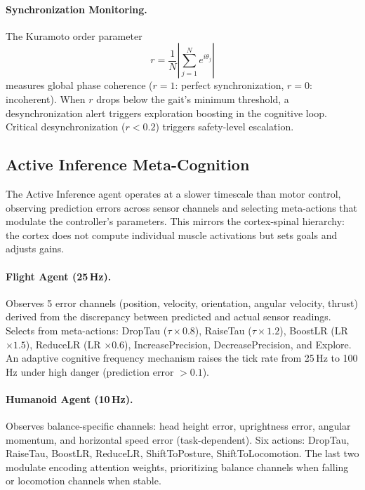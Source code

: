 \documentclass[11pt,twocolumn]{article}
\begin{document}
\paragraph{Synchronization Monitoring.} The Kuramoto order parameter
\begin{equation}
r = \frac{1}{N} \left| \sum_{j=1}^{N} e^{i\theta_j} \right|
\end{equation}
measures global phase coherence ($r = 1$: perfect synchronization, $r = 0$: incoherent). When $r$ drops below the gait's minimum threshold, a desynchronization alert triggers exploration boosting in the cognitive loop. Critical desynchronization ($r < 0.2$) triggers safety-level escalation.

\subsection{Active Inference Meta-Cognition}
\label{sec:fep}

The Active Inference agent operates at a slower timescale than motor control, observing prediction errors across sensor channels and selecting meta-actions that modulate the controller's parameters. This mirrors the cortex-spinal hierarchy: the cortex does not compute individual muscle activations but sets goals and adjusts gains.

\paragraph{Flight Agent (25\,Hz).} Observes 5 error channels (position, velocity, orientation, angular velocity, thrust) derived from the discrepancy between predicted and actual sensor readings. Selects from meta-actions: DropTau ($\tau \times 0.8$), RaiseTau ($\tau \times 1.2$), BoostLR (LR $\times 1.5$), ReduceLR (LR $\times 0.6$), IncreasePrecision, DecreasePrecision, and Explore. An adaptive cognitive frequency mechanism raises the tick rate from 25\,Hz to 100\,Hz under high danger (prediction error $> 0.1$).

\paragraph{Humanoid Agent (10\,Hz).} Observes balance-specific channels: head height error, uprightness error, angular momentum, and horizontal speed error (task-dependent). Six actions: DropTau, RaiseTau, BoostLR, ReduceLR, ShiftToPosture, ShiftToLocomotion. The last two modulate encoding attention weights, prioritizing balance channels when falling or locomotion channels when stable.
\end{document}
